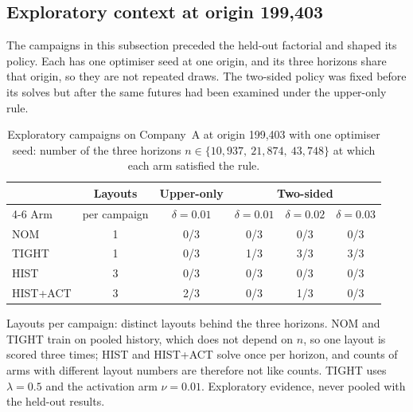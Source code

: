 \subsection{Exploratory context at origin 199,403}\label{subsec:exploratory}
The campaigns in this subsection preceded the held-out factorial and shaped its policy. Each has one optimiser seed at one origin, and its three horizons share that origin, so they are not repeated draws. The two-sided policy was fixed before its solves but after the same futures had been examined under the upper-only rule.

\begin{table}[htbp]
\centering
\caption{Exploratory campaigns on Company~A at origin 199,403 with one optimiser seed: number of the three horizons $n\in\{10{,}937,\ 21{,}874,\ 43{,}748\}$ at which each arm satisfied the rule.}
\label{tab:exploratory}
\small
\begin{tabular}{@{}lccccc@{}}
\toprule
 & Layouts & Upper-only & \multicolumn{3}{c}{Two-sided} \\
\cmidrule(lr){4-6}
Arm & per campaign & $\delta=0.01$ & $\delta=0.01$ & $\delta=0.02$ & $\delta=0.03$ \\
\midrule
NOM      & 1 & 0/3 & 0/3 & 0/3 & 0/3 \\
TIGHT    & 1 & 0/3 & 1/3 & 3/3 & 3/3 \\
HIST     & 3 & 0/3 & 0/3 & 0/3 & 0/3 \\
HIST+ACT & 3 & 2/3 & 0/3 & 1/3 & 0/3 \\
\bottomrule
\end{tabular}
\par\smallskip
\begin{minipage}{\linewidth}\footnotesize
Layouts per campaign: distinct layouts behind the three horizons. NOM and TIGHT train on pooled history, which does not depend on $n$, so one layout is scored three times; HIST and HIST+ACT solve once per horizon, and counts of arms with different layout numbers are therefore not like counts. TIGHT uses $\lambda=0.5$ and the activation arm $\nu=0.01$. Exploratory evidence, never pooled with the held-out results.
\end{minipage}
\end{table}

